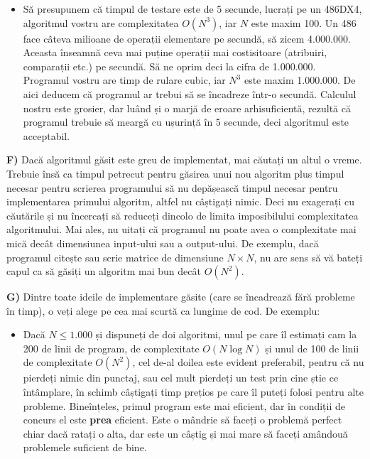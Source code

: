 \begin{itemize}

\item Să presupunem că timpul de testare este de 5 secunde, lucrați pe un
  486DX4, algoritmul vostru are complexitatea $O(N^3)$, iar $N$ este maxim
  100. Un 486 face câteva milioane de operații elementare pe secundă, să zicem
  4.000.000. Aceasta înseamnă ceva mai puține operații mai costisitoare
  (atribuiri, comparații etc.) pe secundă. Să ne oprim deci la cifra de
  1.000.000. Programul vostru are timp de rulare cubic, iar $N^3$ este maxim
  1.000.000. De aici deducem că programul ar trebui să se încadreze într-o
  secundă. Calculul nostru este grosier, dar luând și o marjă de eroare
  arhisuficientă, rezultă că programul trebuie să meargă cu ușurință în 5
  secunde, deci algoritmul este acceptabil.

\end{itemize}

{\bf F)} Dacă algoritmul găsit este greu de implementat, mai căutați un altul
o vreme. Trebuie însă ca timpul petrecut pentru găsirea unui nou algoritm plus
timpul necesar pentru scrierea programului să nu depășească timpul necesar
pentru implementarea primului algoritm, altfel nu câștigați nimic. Deci nu
exagerați cu căutările și nu încercați să reduceți dincolo de limita
imposibilului complexitatea algoritmului. Mai ales, nu uitați că programul nu
poate avea o complexitate mai mică decât dimensiunea input-ului sau a
output-ului. De exemplu, dacă programul citește sau scrie matrice de
dimensiune $N \times N$, nu are sens să vă bateți capul ca să găsiți un
algoritm mai bun decât $O(N^2)$.

{\bf G)} Dintre toate ideile de implementare găsite (care se încadrează fără
probleme în timp), o veți alege pe cea mai scurtă ca lungime de cod. De
exemplu:

\begin{itemize}

\item Dacă $N \leq 1.000$ și dispuneți de doi algoritmi, unul pe care îl
  estimați cam la 200 de linii de program, de complexitate $O(N \log N)$ și
  unul de 100 de linii de complexitate $O(N^2)$, cel de-al doilea este evident
  preferabil, pentru că nu pierdeți nimic din punctaj, sau cel mult pierdeți
  un test prin cine știe ce întâmplare, în schimb câștigați timp prețios pe
  care îl puteți folosi pentru alte probleme. Bineînțeles, primul program este
  mai eficient, dar în condiții de concurs el este {\bf prea} eficient. Este o
  mândrie să faceți o problemă perfect chiar dacă ratați o alta, dar este un
  câștig și mai mare să faceți amândouă problemele suficient de bine.

\end{itemize}

